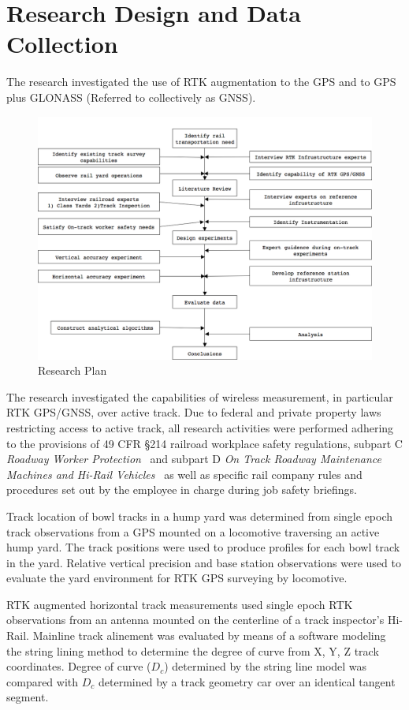 \section{Research Design and Data Collection}
The research investigated the use of RTK augmentation to the GPS and to GPS plus GLONASS (Referred to collectively as GNSS).
\begin{figure}[!h]
	\centering
	\includegraphics[width=6in]{graphics/research_plan.png}
	\caption{Research Plan}
	\label{fig:plan}
\end{figure}
The research investigated the capabilities of wireless measurement, in particular RTK GPS/GNSS, over active track. Due to federal and private property laws restricting access to active track, all research activities were performed adhering to the provisions of 49 CFR \S214 railroad workplace safety regulations, subpart C \textit{Roadway Worker Protection}~\citep{49CFR214300} and subpart D \textit{On Track Roadway Maintenance Machines and Hi-Rail Vehicles}~\citep{49CFR214500} as well as specific rail company rules and procedures set out by the employee in charge during job safety briefings. 

Track location of bowl tracks in a hump yard was determined from single epoch track observations from a GPS mounted on a locomotive traversing an active hump yard. The track positions were used to produce profiles for each bowl track in the yard. Relative vertical precision and base station observations were used to evaluate the yard environment for RTK GPS surveying by locomotive.

RTK augmented horizontal track measurements used single epoch RTK observations from an antenna mounted on the centerline of a track inspector's Hi-Rail. Mainline track alinement was evaluated by means of a software modeling the string lining method to determine the degree of curve from X, Y, Z track coordinates. Degree of curve ($D_c$) determined by the string line model was compared with $D_c$ determined by a track geometry car over an identical tangent segment.

